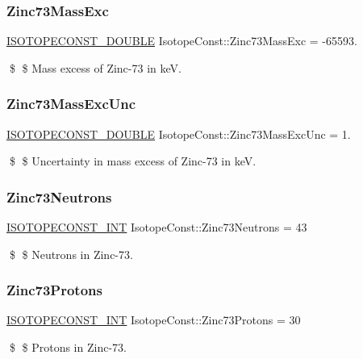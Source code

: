 \subsubsection{\texorpdfstring{Zinc73\+Mass\+Exc}{Zinc73MassExc}}
{\footnotesize\ttfamily \mbox{\hyperlink{group___isotope_const-_macros_ga8f45a7272ce02c0b4c65c44636ed719a}{I\+S\+O\+T\+O\+P\+E\+C\+O\+N\+S\+T\+\_\+\+D\+O\+U\+B\+LE}} Isotope\+Const\+::\+Zinc73\+Mass\+Exc = -\/65593.}

\$ \$ Mass excess of Zinc-\/73 in keV. \mbox{\label{group___isotope_const-_zinc-_zn73_ga4d1dd83a1b0891d51dab64e8f43c98e3}} 
\subsubsection{\texorpdfstring{Zinc73\+Mass\+Exc\+Unc}{Zinc73MassExcUnc}}
{\footnotesize\ttfamily \mbox{\hyperlink{group___isotope_const-_macros_ga8f45a7272ce02c0b4c65c44636ed719a}{I\+S\+O\+T\+O\+P\+E\+C\+O\+N\+S\+T\+\_\+\+D\+O\+U\+B\+LE}} Isotope\+Const\+::\+Zinc73\+Mass\+Exc\+Unc = 1.}

\$ \$ Uncertainty in mass excess of Zinc-\/73 in keV. \mbox{\label{group___isotope_const-_zinc-_zn73_ga40c19a2184e8f7ccfed123770fbc6f65}} 
\subsubsection{\texorpdfstring{Zinc73\+Neutrons}{Zinc73Neutrons}}
{\footnotesize\ttfamily \mbox{\hyperlink{group___isotope_const-_macros_ga5f18360b3e99483a35c32d789e62621c}{I\+S\+O\+T\+O\+P\+E\+C\+O\+N\+S\+T\+\_\+\+I\+NT}} Isotope\+Const\+::\+Zinc73\+Neutrons = 43}

\$ \$ Neutrons in Zinc-\/73. \mbox{\label{group___isotope_const-_zinc-_zn73_ga1650168ad9c3cfe68f32c99d9f058318}} 
\subsubsection{\texorpdfstring{Zinc73\+Protons}{Zinc73Protons}}
{\footnotesize\ttfamily \mbox{\hyperlink{group___isotope_const-_macros_ga5f18360b3e99483a35c32d789e62621c}{I\+S\+O\+T\+O\+P\+E\+C\+O\+N\+S\+T\+\_\+\+I\+NT}} Isotope\+Const\+::\+Zinc73\+Protons = 30}

\$ \$ Protons in Zinc-\/73. 